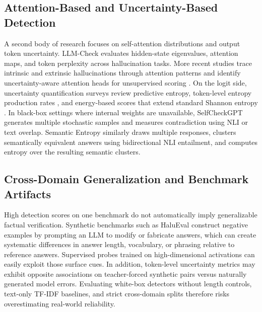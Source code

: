 \documentclass{ieeeaccess}
\begin{document}
\subsection{Attention-Based and Uncertainty-Based Detection}
A second body of research focuses on self-attention distributions and output token uncertainty. LLM-Check \cite{review12} evaluates hidden-state eigenvalues, attention maps, and token perplexity across hallucination tasks. More recent studies trace intrinsic and extrinsic hallucinations through attention patterns \cite{review09} and identify uncertainty-aware attention heads for unsupervised scoring \cite{review11}. On the logit side, uncertainty quantification surveys \cite{review07} review predictive entropy, token-level entropy production rates \cite{review17}, and energy-based scores that extend standard Shannon entropy \cite{review04}. In black-box settings where internal weights are unavailable, SelfCheckGPT \cite{review21} generates multiple stochastic samples and measures contradiction using NLI or text overlap. Semantic Entropy \cite{kuhn2023semantic,farquhar2024detecting} similarly draws multiple responses, clusters semantically equivalent answers using bidirectional NLI entailment, and computes entropy over the resulting semantic clusters.

\subsection{Cross-Domain Generalization and Benchmark Artifacts}
High detection scores on one benchmark do not automatically imply generalizable factual verification. Synthetic benchmarks such as HaluEval \cite{review29} construct negative examples by prompting an LLM to modify or fabricate answers, which can create systematic differences in answer length, vocabulary, or phrasing relative to reference answers. Supervised probes trained on high-dimensional activations can easily exploit those surface cues. In addition, token-level uncertainty metrics may exhibit opposite associations on teacher-forced synthetic pairs versus naturally generated model errors. Evaluating white-box detectors without length controls, text-only TF-IDF baselines, and strict cross-domain splits therefore risks overestimating real-world reliability.
\end{document}
